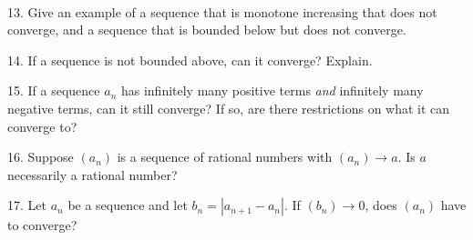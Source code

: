 \documentclass{article}
\begin{document}
~\\

13. Give an example of a sequence that is monotone increasing that does not converge, and a sequence that is bounded below but does not converge.

14. If a sequence is not bounded above, can it converge? Explain.

15. If a sequence $a_n$ has infinitely many positive terms \textit{and} infinitely many negative terms, can it still converge? If so, are there restrictions on what it can converge to?

16. Suppose $(a_n)$ is a sequence of rational numbers with $(a_n) \to a$. Is $a$ necessarily a rational number?

17. Let $a_n$ be a sequence and let $b_n = \left| a_{n + 1} - a_n \right|$. If $(b_n) \to 0$, does $(a_n)$ have to converge?
\end{document}
